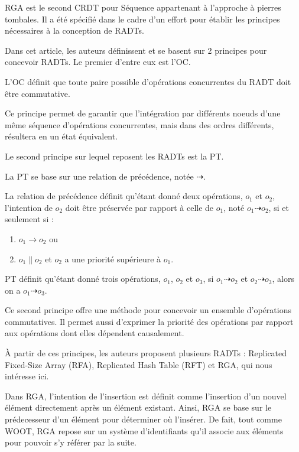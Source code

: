 \acf{RGA} \cite{ROH2011354} est le second \ac{CRDT} pour Séquence appartenant à l'approche à pierres tombales.
Il a été spécifié dans le cadre d'un effort pour établir les principes nécessaires à la conception de \acp{RADT}.

Dans cet article, les auteurs définissent et se basent sur 2 principes pour concevoir RADTs.
Le premier d'entre eux est l'\ac{OC}.
\begin{definition}[\acl{OC}]
  L'\acf{OC} définit que toute paire possible d'opérations concurrentes du \ac{RADT} doit être commutative.
\end{definition}
Ce principe permet de garantir que l'intégration par différents noeuds d'une même séquence d'opérations concurrentes, mais dans des ordres différents, résultera en un état équivalent.

Le second principe sur lequel reposent les RADTs est la \ac{PT}.
\begin{definition}[\acl{PT}]
  La \acf{PT} se base sur une relation de précédence, notée $\dashrightarrow$.
  \begin{subdefinition}
    La relation de précédence définit qu'étant donné deux opérations, $o_1$ et $o_2$, l'intention de $o_2$ doit être préservée par rapport à celle de $o_1$, noté $o_1 \dashrightarrow o_2$, si et seulement si :
    \begin{enumerate}
      \item $o_1 \rightarrow o_2$ ou
      \item $o_1 \parallel o_2$ et $o_2$ a une priorité supérieure à $o_1$.
    \end{enumerate}
  \end{subdefinition}
  \ac{PT} définit qu'étant donné trois opérations, $o_1$, $o_2$ et $o_3$, si $o_1 \dashrightarrow o_2$ et $o_2 \dashrightarrow o_3$, alors on a $o_1 \dashrightarrow o_3$.
\end{definition}
Ce second principe offre une méthode pour concevoir un ensemble d'opérations commutatives.
Il permet aussi d'exprimer la priorité des opérations par rapport aux opérations dont elles dépendent causalement.

À partir de ces principes, les auteurs proposent plusieurs \acp{RADT} : Replicated Fixed-Size Array (RFA), Replicated Hash Table (RFT) et \acf{RGA}, qui nous intéresse ici.

Dans \ac{RGA}, l'intention de l'insertion est définit comme l'insertion d'un nouvel élément directement après un élément existant.
Ainsi, \ac{RGA} se base sur le prédecesseur d'un élément pour déterminer où l'insérer.
De fait, tout comme WOOT, \ac{RGA} repose sur un système d'identifiants qu'il associe aux éléments pour pouvoir s'y référer par la suite.

